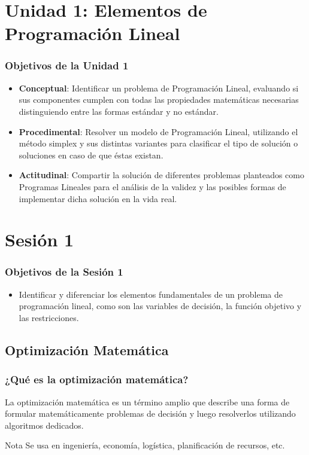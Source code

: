 \documentclass{beamer}
\begin{document}
\section{Unidad 1: Elementos de Programación Lineal}
\begin{frame}
\frametitle{Objetivos de la Unidad 1}
\begin{itemize}
    \item \textbf{Conceptual}: Identificar un problema de Programación Lineal, evaluando si sus componentes cumplen con todas las propiedades matemáticas necesarias distinguiendo entre las formas estándar y no estándar.
    \item \textbf{Procedimental}: Resolver un modelo de Programación Lineal, utilizando el método simplex y sus distintas variantes para clasificar el tipo de solución o soluciones en caso de que éstas existan.
    \item \textbf{Actitudinal}: Compartir la solución de diferentes problemas planteados como Programas Lineales para el análisis de la validez y las posibles formas de implementar dicha solución en la vida real.
\end{itemize}
\end{frame}

\section{Sesión 1}
\begin{frame}
\frametitle{Objetivos de la Sesión 1}
\begin{itemize}
    \item Identificar y diferenciar los elementos fundamentales de un problema de programación lineal, como son las variables de decisión, la función objetivo y las restricciones.
\end{itemize}
\end{frame}

\subsection{Optimización Matemática}
\begin{frame}
\frametitle{¿Qué es la optimización matemática?}
La optimización matemática es un término amplio que describe una forma de formular matemáticamente problemas de decisión y luego resolverlos utilizando algoritmos dedicados. 
\begin{block}{Nota}
Se usa en ingeniería, economía, logística, planificación de recursos, etc.
\end{block}
\end{frame}
\end{document}
